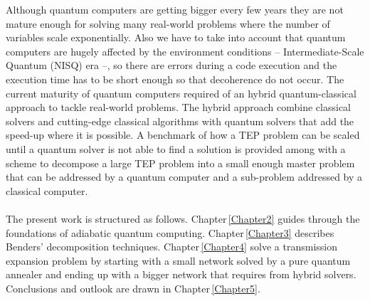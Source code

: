 %
%
Although quantum computers are getting bigger every few years they are not mature enough for solving many real-world problems where the number of variables scale exponentially. Also we have to take into account that quantum computers are hugely affected by the environment conditions -- Intermediate-Scale Quantum (NISQ) era --, so there are errors during a code execution and the execution time has to be short enough so that decoherence do not occur. The current maturity of quantum computers required of an hybrid quantum-classical approach to tackle real-world problems. The hybrid approach combine classical solvers and cutting-edge classical algorithms with quantum solvers that add the speed-up where it is possible. A benchmark of how a TEP problem can be scaled until a quantum solver is not able to find a solution is provided among with a scheme to decompose a large TEP problem into a small enough master problem that can be addressed by a quantum computer and a sub-problem addressed by a classical computer. \\\\
%
The present work is structured as follows. Chapter\,\ref{Chapter2} guides through the foundations of adiabatic quantum computing. Chapter\,\ref{Chapter3} describes Benders' decomposition techniques. Chapter\,\ref{Chapter4} solve a transmission expansion problem by starting with a small network solved by a pure quantum annealer and ending up with a bigger network that requires from hybrid solvers. Conclusions and outlook are drawn in Chapter\,\ref{Chapter5}.
